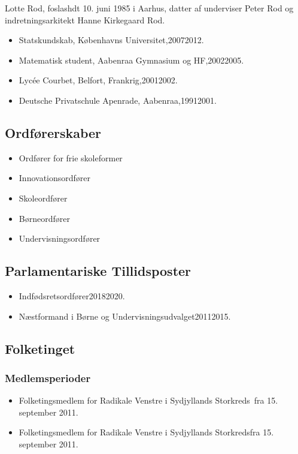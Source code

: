 \documentclass[11pt, a4paper]{awesome-cv}
\begin{document}
\makecvheader[R]
\makelettertitle
\begin{cvletter}
Lotte Rod, foslashdt 10. juni 1985 i Aarhus, datter af underviser Peter Rod og indretningsarkitekt Hanne Kirkegaard Rod.

\begin{itemize}
\item Statskundskab, Københavns Universitet,20072012.
\item Matematisk student, Aabenraa Gymnasium og HF,20022005.
\item Lycée Courbet, Belfort, Frankrig,20012002.
\item Deutsche Privatschule Apenrade, Aabenraa,19912001.
\end{itemize}
\subsection*{Ordførerskaber}
\begin{itemize}
\item Ordfører for frie skoleformer
\item Innovationsordfører
\item Skoleordfører
\item Børneordfører
\item Undervisningsordfører
\end{itemize}
\subsection*{Parlamentariske Tillidsposter}
\begin{itemize}
\item Indfødsretsordfører20182020.
\item Næstformand i Børne og Undervisningsudvalget20112015.
\end{itemize}
\subsection*{Folketinget}
\subsubsection*{Medlemsperioder}
\begin{itemize}
\item Folketingsmedlem for Radikale Venstre i Sydjyllands Storkreds fra 15. september 2011.
\item Folketingsmedlem for Radikale Venstre i Sydjyllands Storkredsfra 15. september 2011.
\end{itemize}

\end{cvletter}
\end{document}
